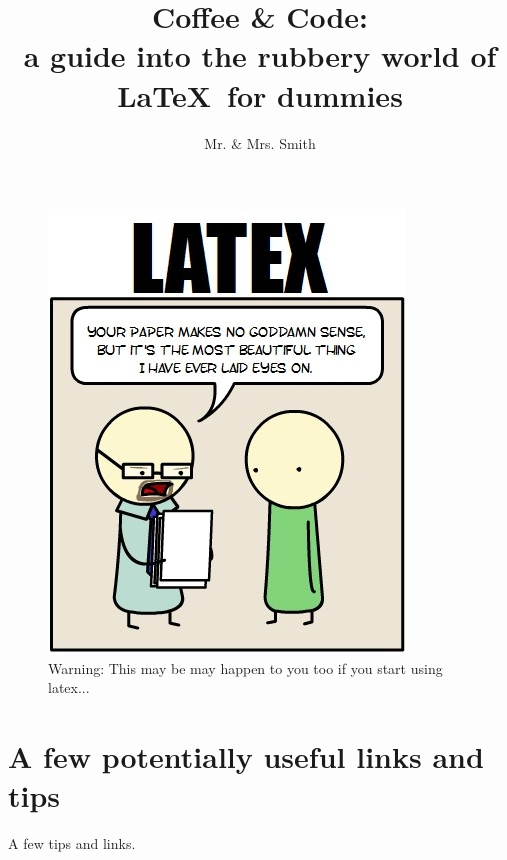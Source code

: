 \documentclass[]{article}
\title{{\Huge Coffee \& Code:} \\
a guide into the rubbery world of \Huge\LaTeX \ for dummies}
\author{Mr. \& Mrs. Smith}
\begin{document}
\maketitle

\begin{figure}[h!]
\centering
\includegraphics[scale=0.5]{./latex_comic.jpg}
\caption{Warning: This may be may happen to you too if you start using latex...}
\end{figure}


\section*{A few potentially useful links and tips}

A few tips and links.
\end{document}

